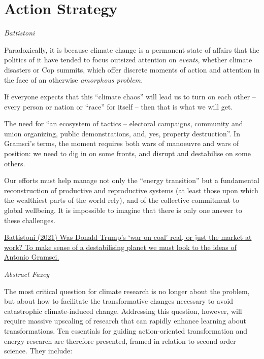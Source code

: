 \documentclass[
]{book}
\begin{document}
\hypertarget{action-strategy}{%
\chapter{Action Strategy}\label{action-strategy}}

\emph{Battistoni}

Paradoxically, it is because climate change is a permanent state of affairs that the politics of it have tended to focus outsized attention on \emph{events}, whether climate disasters or Cop summits, which offer discrete moments of action and attention in the face of an otherwise \emph{amorphous problem.}

If everyone expects that this ``climate chaos'' will lead us to turn on each other -- every person or nation or ``race'' for itself -- then that is what we will get.

The need for ``an ecosystem of tactics -- electoral campaigns, community and union organizing, public demonstrations, and, yes, property destruction''.
In Gramsci's terms, the moment requires both wars of manoeuvre and wars of position: we need to dig in on some fronts, and disrupt and destabilise on some others.

Our efforts must help manage not only the ``energy transition'' but a fundamental reconstruction of productive and reproductive systems (at least those upon which the wealthiest parts of the world rely), and of the collective commitment to global wellbeing. It is impossible to imagine that there is only one answer to these challenges.

\href{https://www.newstatesman.com/ideas/2021/11/what-kind-of-crisis-is-the-climate-crisis}{Battistoni (2021) Was Donald Trump's `war on coal' real, or just the market at work?
To make sense of a destabilising planet we must look to the ideas of Antonio Gramsci.}

\emph{Abstract Fazey}

The most critical question for climate research is no longer about the problem,
but about how to facilitate the transformative changes necessary to avoid
catastrophic climate-induced change.
Addressing this question, however, will require massive upscaling of research
that can rapidly enhance learning about transformations.
Ten essentials for guiding action-oriented transformation and energy research are therefore presented,
framed in relation to second-order science.
They include:
\end{document}
